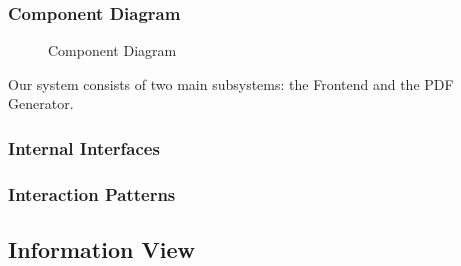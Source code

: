 \documentclass[a4paper]{article}
\begin{document}
    \subsubsection{Component Diagram}
    \begin{figure}
        
        \caption{Component Diagram}
    \end{figure}

    Our system consists of two main subsystems: the Frontend and the PDF Generator.


    \subsubsection{Internal Interfaces}
    \lipsum[1-1] %
    \subsubsection{Interaction Patterns}
    \lipsum[1-1] %
    \subsection{Information View}
\end{document}
